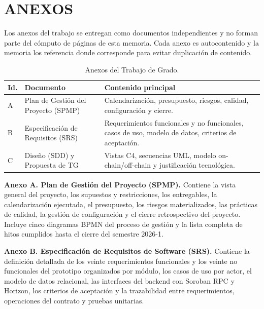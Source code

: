\newpage
\section{ANEXOS}

Los anexos del trabajo se entregan como documentos independientes y no forman parte del cómputo de páginas de
esta memoria. Cada anexo es autocontenido y la memoria los referencia donde corresponde para evitar
duplicación de contenido.

\begin{table}[H]
\centering
\small
\renewcommand{\arraystretch}{1.3}
\caption{Anexos del Trabajo de Grado.}
\label{tab:anexos}
\begin{tabularx}{\textwidth}{>{\centering\arraybackslash}p{1.5cm} >{\raggedright\arraybackslash}p{6.0cm}
>{\raggedright\arraybackslash}X}
\toprule
\rowcolor{rowgray}
\textbf{Id.} & \textbf{Documento} & \textbf{Contenido principal} \\
\midrule
A & Plan de Gestión del Proyecto (SPMP) & Calendarización, presupuesto, riesgos, calidad, configuración y
cierre. \\
\rowcolor{rowgray}
B & Especificación de Requisitos (SRS) & Requerimientos funcionales y no funcionales, casos de uso, modelo de
datos, criterios de aceptación. \\
C & Diseño (SDD) y Propuesta de TG & Vistas C4, secuencias UML, modelo on-chain/off-chain y justificación
tecnológica. \\
\bottomrule
\end{tabularx}
\end{table}

\textbf{Anexo A. Plan de Gestión del Proyecto (SPMP).} Contiene la vista general del proyecto, los supuestos
y restricciones, los entregables, la calendarización ejecutada, el presupuesto, los riesgos materializados,
las prácticas de calidad, la gestión de configuración y el cierre retrospectivo del proyecto. Incluye cinco
diagramas BPMN del proceso de gestión y la lista completa de hitos cumplidos hasta el cierre del semestre
2026-1.

\textbf{Anexo B. Especificación de Requisitos de Software (SRS).} Contiene la definición detallada de los
veinte requerimientos funcionales y los veinte no funcionales del prototipo organizados por módulo, los casos
de uso por actor, el modelo de datos relacional, las interfaces del backend con Soroban RPC y Horizon, los
criterios de aceptación y la trazabilidad entre requerimientos, operaciones del contrato y pruebas unitarias.

